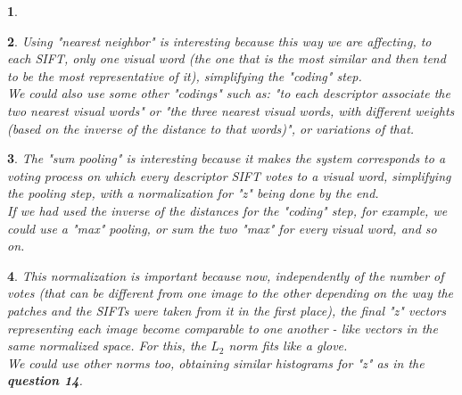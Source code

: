 \documentclass[10pt]{article} %
\theoremstyle{question-style}
\newtheorem{answer}{\arabic{answer}}
\begin{document}
\begin{flushleft}
\begin{answer}
\end{answer}

\begin{answer}
Using "nearest neighbor" is interesting because this way we are affecting, to each SIFT, only one visual word (the one that is the most similar and then tend to be the most representative of it), simplifying the "coding" step. \\

\quad We could also use some other "codings" such as: "to each descriptor associate the two nearest visual words" or "the three nearest visual words, with different weights (based on the inverse of the distance to that words)", or variations of that.
\end{answer}

\begin{answer} %
The "sum pooling" is interesting because it makes the system corresponds to a voting process on which every descriptor SIFT votes to a visual word, simplifying the pooling step, with a normalization for "z" being done by the end. \\

If we had used the inverse of the distances for the "coding" step, for example, we could use a "max" pooling, or sum the two "max" for every visual word, and so on. 

\end{answer}

\begin{answer}
This normalization is important because now, independently of the number of votes (that can be different from one image to the other depending on the way the patches and the SIFTs were taken from it in the first place), the final "z" vectors representing each image become comparable to one another - like vectors in the same normalized space. For this, the $L_2$ norm fits like a glove. \\

We could use other norms too, obtaining similar histograms for "z" as in the \textbf{question 14}.
\end{answer}

\setcounter{answer}{0}

\end{flushleft}
\end{document}
